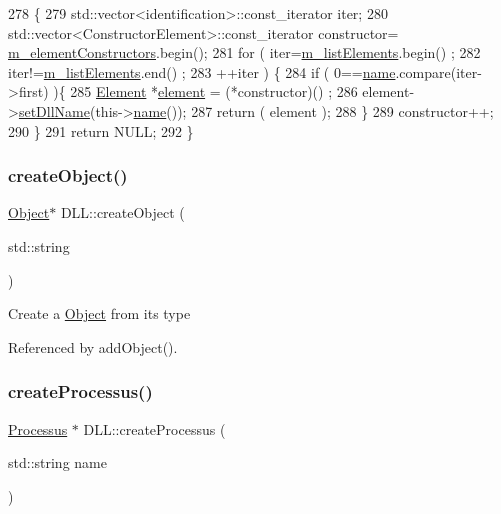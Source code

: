 \begin{DoxyCode}
278                                              \{
279   std::vector<identification>::const\_iterator iter;
280   std::vector<ConstructorElement>::const\_iterator constructor=
      \hyperlink{classDLL_a7ee65d305f4f6014f6499d69f162d024}{m\_elementConstructors}.begin();
281   \textcolor{keywordflow}{for} ( iter=\hyperlink{classDLL_a2e88d7167245fd7b6a000817583643ed}{m\_listElements}.begin() ;
282         iter!=\hyperlink{classDLL_a2e88d7167245fd7b6a000817583643ed}{m\_listElements}.end() ;
283         ++iter ) \{
284     \textcolor{keywordflow}{if} ( 0==\hyperlink{classDLL_a0a915d538771dde2cb0580cd340ee088}{name}.compare(iter->first) )\{
285       \hyperlink{classElement}{Element} *\hyperlink{namespaceelement}{element} = (*constructor)() ;
286       element->\hyperlink{classObject_a870c5af919958c2136623b2d7816d123}{setDllName}(this->\hyperlink{classDLL_a0a915d538771dde2cb0580cd340ee088}{name}());
287       \textcolor{keywordflow}{return} ( element );
288     \}
289     constructor++;
290   \}
291   \textcolor{keywordflow}{return} NULL;
292 \}
\end{DoxyCode}
\mbox{\label{classDLL_aab0ac14c9ae23fe6cb9aadb2cbc87424}} 
\subsubsection{\texorpdfstring{create\+Object()}{createObject()}}
{\footnotesize\ttfamily \hyperlink{classObject}{Object}$\ast$ D\+L\+L\+::create\+Object (\begin{DoxyParamCaption}\item[{std\+::string}]{ }\end{DoxyParamCaption})}

Create a \hyperlink{classObject}{Object} from its type 

Referenced by add\+Object().

\mbox{\label{classDLL_a9136bcd5e5ca7894bd337241803735c3}} 
\subsubsection{\texorpdfstring{create\+Processus()}{createProcessus()}}
{\footnotesize\ttfamily \hyperlink{classProcessus}{Processus} $\ast$ D\+L\+L\+::create\+Processus (\begin{DoxyParamCaption}\item[{std\+::string}]{name }\end{DoxyParamCaption})}


